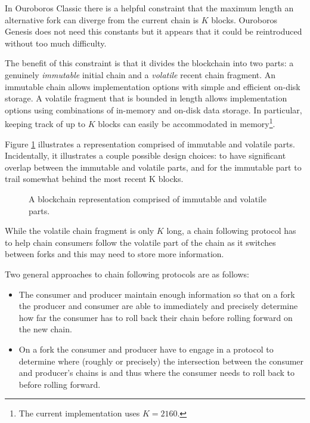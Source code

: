 \documentclass{article}
\theoremstyle{definition}{
  \newtheorem{lemma}{Lemma}[section] %
  \newtheorem{definition}[lemma]{Definition}
}
\theoremstyle{theorem}{
  \newtheorem{invariant}[lemma]{Invariant}
  \newtheorem{proofobligation}[lemma]{Proof Obligation}
}
\numberwithin{equation}{lemma}
\begin{document}
In Ouroboros Classic there is a helpful constraint that the maximum length an
alternative fork can diverge from the current chain is $K$ blocks. Ouroboros
Genesis does not need this constants but it appears that it could be
reintroduced without too much difficulty.

The benefit of this constraint is that it divides the blockchain into two parts:
a genuinely \emph{immutable} initial chain and a \emph{volatile} recent chain
fragment. An immutable chain allows implementation options with simple and
efficient on-disk storage. A volatile fragment that is bounded in length allows
implementation options using combinations of in-memory and on-disk data storage.
In particular, keeping track of up to $K$ blocks can easily be accommodated in
memory\footnote{The current implementation uses $K = 2160$.}.

Figure \ref{chain-diagram-imm-vol} illustrates a representation comprised of
immutable and volatile parts. Incidentally, it illustrates a couple possible
design choices: to have significant overlap between the immutable and volatile
parts, and for the immutable part to trail somewhat behind the most recent K
blocks.

\begin{figure}
\begin{center}
\end{center}
\caption{A blockchain representation comprised of immutable and volatile parts.}
\label{chain-diagram-imm-vol}
\end{figure}

While the volatile chain fragment is only $K$ long, a chain following protocol
has to help chain consumers follow the volatile part of the chain as it
switches between forks and this may need to store more information.

Two general approaches to chain following protocols are as follows:
\begin{itemize}
\item The consumer and producer maintain enough information so that on a fork
      the producer and consumer are able to immediately and precisely determine
      how far the consumer has to roll back their chain before rolling forward
      on the new chain.
\item On a fork the consumer and producer have to engage in a protocol to
      determine where (roughly or precisely) the intersection between the
      consumer and producer's chains is and thus where the consumer needs to
      roll back to before rolling forward.
\end{itemize}
\end{document}
